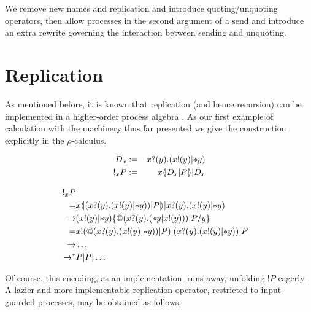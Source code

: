 \documentclass{llncs}
\makeatletter
\newcommand{\lliftb}{\langle\!|}
\newcommand{\rliftb}{|\!\rangle}
\newcommand{\binpar}[2]{#1 | #2}
\newcommand{\outputp}[2]{#1!(#2)}
\newcommand{\prefix}[3]{#1?(#2) . #3}
\newcommand{\lift}[2]{#1 \lliftb #2 \rliftb}
\newcommand{\quotep}[1]{\mathsf{@}#1}
\newcommand{\dropn}[1]{\mathsf{*}#1}
\newcommand{\bangp}[1]{! #1}
\newcommand{\substn}[2]{\{ #1 / #2 \}}
\newcommand{\bc}{\mathbin{\mathbf{::=}}}
\newcommand{\bm}{\mathbin{\mathbf\mid}}
\newcommand{\red}{\rightarrow}
\newcommand{\rhoc}{$\rho$-calculus}
\makeatother
\begin{document}
We remove new names and replication and introduce quoting/unquoting
operators, then allow processes in the second argument of a send and introduce an extra rewrite governing the interaction between sending and unquoting.


\section{Replication}

As mentioned before, it is known that replication (and hence
recursion) can be implemented in a higher-order process algebra
\cite{SangiorgiWalker}. As our first example of calculation with the
machinery thus far presented we give the construction explicitly in
the {\rhoc}.

\begin{eqnarray}
	D_{x} & := & \prefix{x}{y}{(\binpar{\outputp{x}{y}}{\dropn{y}})} \nonumber\\
	\bangp_{x}{P} & := & \binpar{\lift{x}{\binpar{D_{x}}{P}}}{D_{x}} \nonumber
\end{eqnarray}

\begin{eqnarray}
	\bangp_{x}{P} & & \nonumber\\
	=
	& \lift{x}{(\prefix{x}{y}{(\outputp{x}{y} | \dropn{y})) | P}} 
	      | \prefix{x}{y}{(\outputp{x}{y} | \dropn{y})} & \nonumber\\
	\red
	& (\outputp{x}{y} | \dropn{y})\substn{\quotep{(\prefix{x}{y}{(\dropn{y} | \outputp{x}{y})) | P}}}{y} & \nonumber\\
	=
	& \outputp{x}{\quotep{(\prefix{x}{y}{(\outputp{x}{y} | \dropn{y})) | P}}}
	  | {(\prefix{x}{y}{(\outputp{x}{y} | \dropn{y})) | P}} & \nonumber\\
	\red
	& \ldots & \nonumber\\
	\red^*
	& P | P | \ldots & \nonumber
\end{eqnarray}

Of course, this encoding, as an implementation, runs away, unfolding
$\bangp{P}$ eagerly. A lazier and more implementable replication
operator, restricted to input-guarded processes, may be obtained as follows.
\end{document}

